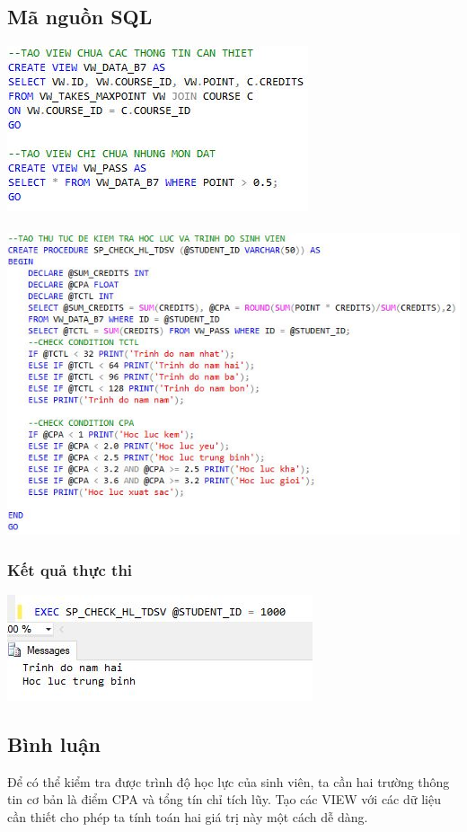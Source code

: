 \documentclass[12pt,a4paper]{report}
\begin{document}
\subsection{Mã nguồn SQL}
\includegraphics[scale=1]{b7s1}\\\\
\includegraphics[scale=.92]{b7s2}
\subsubsection{Kết quả thực thi}
\includegraphics[scale=1]{kb7s}
\subsection{Bình luận}
Để có thể kiểm tra được trình độ học lực của sinh viên, ta cần hai trường thông tin cơ bản là điểm CPA và tổng tín chỉ tích lũy. Tạo các VIEW với các dữ liệu cần thiết cho phép ta tính toán hai giá trị này một cách dễ dàng. 
\end{document}
